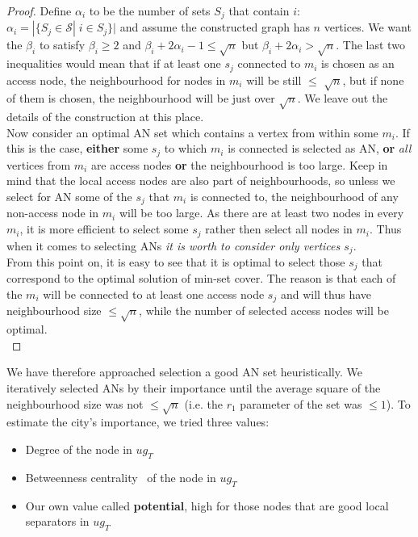 \documentclass{svk_long_en}
\begin{document}
\begin{proof}
			\noindent Define $\alpha_{i}$ to be the number of sets $S_{j}$ that contain $i$: $\alpha_{i} = |\{S_{j} \in \mathcal{S}| \; i \in S_{j}\}|$ and assume the constructed graph has $n$ vertices. We want the $\beta_{i}$ to satisfy $\beta_{i} \geq 2$ and $\beta_{i} + 2\alpha_{i} - 1 \leq \sqrt{n}$ but $\beta_{i} + 2\alpha_{i} > \sqrt{n}$. The last two inequalities would mean that if at least one $s_{j}$ connected to $m_{i}$ is chosen as an access node, the neighbourhood for nodes in $m_{i}$ will be still $\leq$ $\sqrt{n}$, but if none of them is chosen, the neighbourhood will be just over $\sqrt{n}$. We leave out the details of the construction at this place. \\
			
			Now consider an optimal AN set which contains a vertex from within some $m_{i}$. If this is the case, \textbf{either} some $s_{j}$ to which $m_{i}$ is connected is selected as AN, \textbf{or} \textit{all} vertices from $m_{i}$ are access nodes \textbf{or} the neighbourhood is too large. Keep in mind that the local access nodes are also part of neighbourhoods, so unless we select for AN some of the $s_{j}$ that $m_{i}$ is connected to, the neighbourhood of any non-access node in $m_{i}$ will be too large. As there are at least two nodes in every $m_{i}$, it is more efficient to select some $s_{j}$ rather then select all nodes in $m_{i}$. Thus when it comes to selecting ANs \textit{it is worth to consider only vertices $s_{j}$}. \\
			
			From this point on, it is easy to see that it is optimal to select those $s_{j}$ that correspond to the optimal solution of min-set cover. The reason is that each of the $m_{i}$ will be connected to at least one access node $s_{j}$ and will thus have neighbourhood size $\leq \sqrt{n}$, while the number of selected access nodes will be optimal. \\
		\end{proof}
		
		We have therefore approached selection a good AN set heuristically. We iteratively selected ANs by their importance until the average square of the neighbourhood size was not $\leq \sqrt{n}$ (i.e. the $r_{1}$ parameter of the set was $\leq 1$). To estimate the city's importance, we tried three values:
		\begin{itemize}
			\item Degree of the node in $ug_{T}$
			\item Betweenness centrality~\cite{centrality01} of the node in $ug_{T}$
			\item Our own value called \textbf{potential}, high for those nodes that are good local separators in $ug_{T}$
		\end{itemize}
		\hspace{\fill}
		
\end{document}
